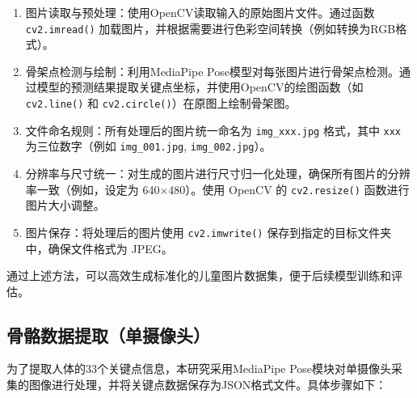 \begin{enumerate}
    \item 图片读取与预处理：使用OpenCV读取输入的原始图片文件。通过函数 \texttt{cv2.imread()} 加载图片，并根据需要进行色彩空间转换（例如转换为RGB格式）。
    \item 骨架点检测与绘制：利用MediaPipe Pose模型对每张图片进行骨架点检测。通过模型的预测结果提取关键点坐标，并使用OpenCV的绘图函数（如 \texttt{cv2.line()} 和 \texttt{cv2.circle()}）在原图上绘制骨架图。
    \item 文件命名规则：所有处理后的图片统一命名为 \texttt{img\_xxx.jpg} 格式，其中 \texttt{xxx} 为三位数字（例如 \texttt{img\_001.jpg}, \texttt{img\_002.jpg}）。
    \item 分辨率与尺寸统一：对生成的图片进行尺寸归一化处理，确保所有图片的分辨率一致（例如，设定为 640×480）。使用 OpenCV 的 \texttt{cv2.resize()} 函数进行图片大小调整。
    \item 图片保存：将处理后的图片使用 \texttt{cv2.imwrite()} 保存到指定的目标文件夹中，确保文件格式为 JPEG。
\end{enumerate}

通过上述方法，可以高效生成标准化的儿童图片数据集，便于后续模型训练和评估。

\subsection{骨骼数据提取（单摄像头）}

为了提取人体的33个关键点信息，本研究采用MediaPipe Pose模块对单摄像头采集的图像进行处理，并将关键点数据保存为JSON格式文件。具体步骤如下：

